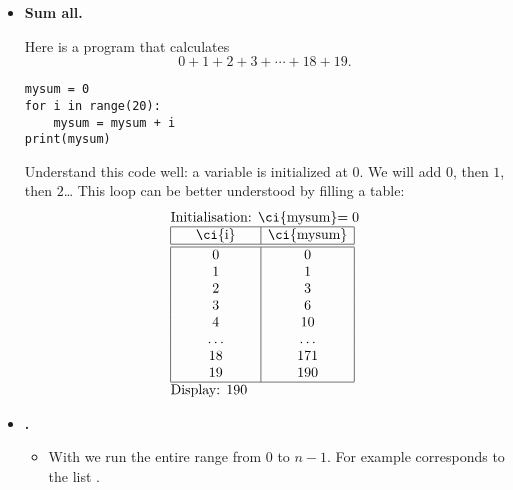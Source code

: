\documentclass[11pt,class=report,crop=false]{standalone}
\begin{document}
\begin{cours}
\begin{itemize}
  \item \textbf{Sum all.}

Here is a program that calculates 
$$0+1+2+3+\cdots + 18 +19.$$

\begin{center}
\begin{minipage}{0.5\textwidth} 
\begin{lstlisting}
mysum = 0
for i in range(20):
    mysum = mysum + i
print(mysum)
\end{lstlisting}
\end{minipage}
\end{center} 

Understand this code well: a variable  is initialized at $0$. 
We will add $0$, then $1$, then $2$\ldots{}
This loop can be better understood by filling a table:
  $$
  \begin{array}{l}
  \text{Initialisation: \ci{mysum}$=0$}    \\
  \begin{array}{|c|c|}
  \hline  
   \text{\ci{i}} &  \text{\ci{mysum}} \\
  \hline\hline
  0 & 0 \\  
  1 & 1 \\
  2 & 3 \\
  3 & 6 \\
  4 & 10\\
  \hspace*{5ex}\ldots\hspace*{5ex} & \hspace*{5ex}\ldots\hspace*{5ex} \\
  18 & 171 \\
  19 & 190 \\ 
  \hline
  \end{array} \\
  \text{Display: $190$}  
  \end{array} 
  $$ 
\end{itemize} 


\mybox
{ 
 \begin{minipage}{0.95\textwidth}
 \begin{itemize}
 \item \textbf{.}
	\begin{itemize}
	  \item With  we run the entire range from $0$ to $n-1$.
	  For example  corresponds to the list \ci{[0, 1, 2, 3, 4, 5, 6, 7, 8, 9]}. 
	  

\end{itemize}
\end{itemize}
\end{minipage}}
\end{cours}
\end{document}
